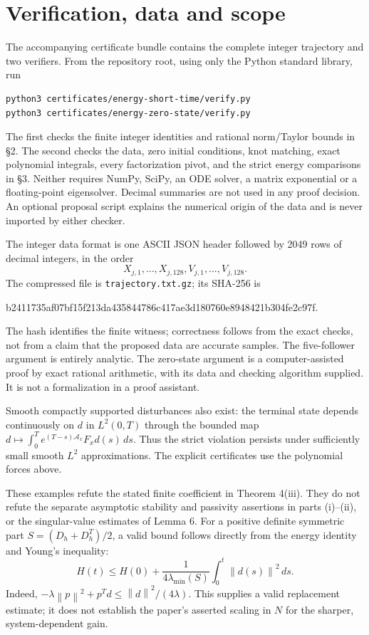 \documentclass[11pt,letterpaper]{article}
\newcommand{\norm}[1]{\left\lVert#1\right\rVert}
\begin{document}
\section{Verification, data and scope}

The accompanying certificate bundle contains the complete integer trajectory
and two verifiers. From the repository root, using only the Python standard
library, run
\begin{verbatim}
python3 certificates/energy-short-time/verify.py
python3 certificates/energy-zero-state/verify.py
\end{verbatim}
The first checks the finite integer identities and rational norm/Taylor bounds
in \S2. The second checks the data, zero initial conditions, knot matching,
exact polynomial integrals, every factorization pivot, and the strict energy
comparisons in \S3. Neither requires NumPy, SciPy, an ODE solver, a matrix
exponential or a floating-point eigensolver. Decimal summaries are not used
in any proof decision. An optional proposal script explains the numerical
origin of the data and is never imported by either checker.

The integer data format is one ASCII JSON header followed by 2049 rows of decimal
integers, in the order
\[
 X_{j,1},\ldots,X_{j,128},V_{j,1},\ldots,V_{j,128}.
\]
The compressed file is \texttt{trajectory.txt.gz}; its SHA-256 is
\begin{center}\footnotesize\ttfamily
b2411735af07bf15f213da435844786c417ae3d180760e8948421b304fe2c97f.
\end{center}
The hash identifies the finite witness; correctness follows from the exact
checks, not from a claim that the proposed data are accurate samples.
The five-follower argument is entirely analytic. The zero-state argument is
a computer-assisted proof by exact rational arithmetic, with its data and
checking algorithm supplied. It is not a formalization in a proof assistant.

Smooth compactly supported disturbances also exist: the terminal state depends
continuously on $d$ in $L^2(0,T)$ through the bounded map
$d\mapsto\int_0^T e^{(T-s)\mathcal A_x}F_xd(s)\,ds$.
Thus the strict violation persists under sufficiently small smooth $L^2$
approximations. The explicit certificates use the polynomial forces above.

These examples refute the stated finite coefficient in Theorem 4(iii).
They do not refute the separate asymptotic stability and passivity assertions
in parts (i)--(ii), or the singular-value estimates of Lemma 6.
For a positive definite symmetric part $S=(D_h+D_h^T)/2$, a valid bound follows
directly from the energy identity and Young's inequality:
\[
 H(t)\leq H(0)+\frac1{4\lambda_{\min}(S)}
                     \int_0^t\norm{d(s)}^2\,ds.
\]
Indeed, $-\lambda\norm p^2+p^Td\leq\norm d^2/(4\lambda)$.
This supplies a valid replacement estimate; it does not establish the
paper's asserted scaling in $N$ for the sharper, system-dependent gain.
\end{document}
